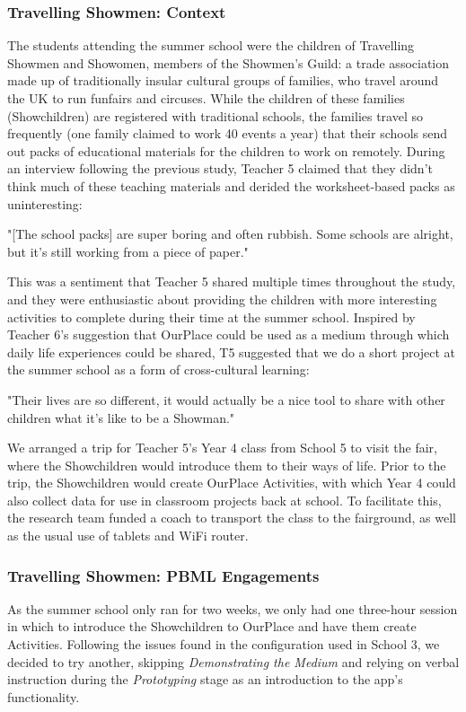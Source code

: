 \subsubsection{Travelling Showmen: Context}
The students attending the summer school were the children of Travelling Showmen and Showomen, members of the Showmen's Guild: a trade association made up of traditionally insular cultural groups of families, who travel around the UK to run funfairs and circuses. While the children of these families (Showchildren) are registered with traditional schools, the families travel so frequently (one family claimed to work 40 events a year) that their schools send out packs of educational materials for the children to work on remotely. During an interview following the previous study, Teacher 5 claimed that they didn't think much of these teaching materials and derided the worksheet-based packs as uninteresting: 

\begin{displayquote}
"[The school packs] are super boring and often rubbish. Some schools are alright, but it's still working from a piece of paper."
\end{displayquote}

This was a sentiment that Teacher 5 shared multiple times throughout the study, and they were enthusiastic about providing the children with more interesting activities to complete during their time at the summer school. Inspired by Teacher 6's suggestion that OurPlace could be used as a medium through which daily life experiences could be shared, T5 suggested that we do a short project at the summer school as a form of cross-cultural learning: 

\begin{displayquote}
"Their lives are so different, it would actually be a nice tool to share with other children what it's like to be a Showman."
\end{displayquote}

We arranged a trip for Teacher 5's Year 4 class from School 5 to visit the fair, where the Showchildren would introduce them to their ways of life. Prior to the trip, the Showchildren would create OurPlace Activities, with which Year 4 could also collect data for use in classroom projects back at school. To facilitate this, the research team funded a coach to transport the class to the fairground, as well as the usual use of tablets and WiFi router.

\subsubsection{Travelling Showmen: PBML Engagements}
As the summer school only ran for two weeks, we only had one three-hour session in which to introduce the Showchildren to OurPlace and have them create Activities. Following the issues found in the configuration used in School 3, we decided to try another, skipping \textit{Demonstrating the Medium} and relying on verbal instruction during the \textit{Prototyping} stage as an introduction to the app's functionality. 

